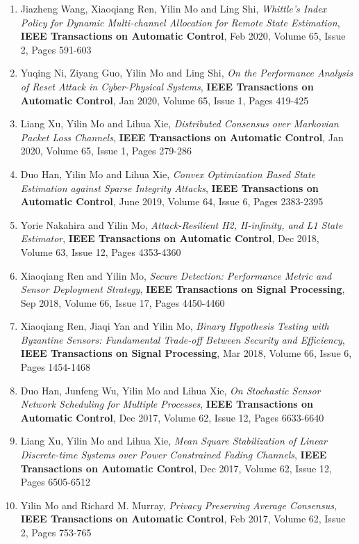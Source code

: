 \documentclass[10pt, a4paper]{article}
\begin{document}
\begin{enumerate}
\item Jiazheng Wang, Xiaoqiang Ren, Yilin Mo and Ling Shi, \emph{Whittle's Index Policy for Dynamic Multi-channel Allocation for Remote State Estimation}, \textbf{IEEE Transactions on Automatic Control}, Feb 2020, Volume 65, Issue 2, Pages 591-603
\item Yuqing Ni, Ziyang Guo, Yilin Mo and Ling Shi, \emph{On the Performance Analysis of Reset Attack in Cyber-Physical Systems}, \textbf{IEEE Transactions on Automatic Control}, Jan 2020, Volume 65, Issue 1, Pages 419-425
\item Liang Xu, Yilin Mo and Lihua Xie, \emph{Distributed Consensus over Markovian Packet Loss Channels}, \textbf{IEEE Transactions on Automatic Control}, Jan 2020, Volume 65, Issue 1, Pages 279-286
\item Duo Han, Yilin Mo and Lihua Xie, {\emph{Convex Optimization Based State Estimation against Sparse Integrity Attacks}}, \textbf{IEEE Transactions on Automatic Control}, June 2019, Volume 64, Issue 6, Pages 2383-2395
\item Yorie Nakahira and Yilin Mo, \emph{Attack-Resilient H2, H-infinity, and L1 State Estimator}, \textbf{IEEE Transactions on Automatic Control}, Dec 2018, Volume 63, Issue 12, Pages 4353-4360
\item Xiaoqiang Ren and Yilin Mo, \emph{Secure Detection: Performance Metric and Sensor Deployment Strategy}, \textbf{IEEE Transactions on Signal Processing}, Sep 2018, Volume 66, Issue 17, Pages 4450-4460
\item Xiaoqiang Ren, Jiaqi Yan and Yilin Mo, {\emph{Binary Hypothesis Testing with Byzantine Sensors: Fundamental Trade-off Between Security and Efficiency}}, \textbf{IEEE Transactions on Signal Processing}, Mar 2018, Volume 66, Issue 6, Pages 1454-1468
\item Duo Han, Junfeng Wu, Yilin Mo and Lihua Xie, \emph{On Stochastic Sensor Network Scheduling for Multiple Processes}, \textbf{IEEE Transactions on Automatic Control}, Dec 2017, Volume 62, Issue 12, Pages 6633-6640
\item Liang Xu, Yilin Mo and Lihua Xie, \emph{Mean Square Stabilization of Linear Discrete-time Systems over Power Constrained Fading Channels}, \textbf{IEEE Transactions on Automatic Control}, Dec 2017, Volume 62, Issue 12, Pages 6505-6512
\item Yilin Mo and Richard M. Murray, {\emph{Privacy Preserving Average Consensus}}, \textbf{IEEE Transactions on Automatic Control}, Feb 2017, Volume 62, Issue 2, Pages 753-765

\end{enumerate}
\end{document}
